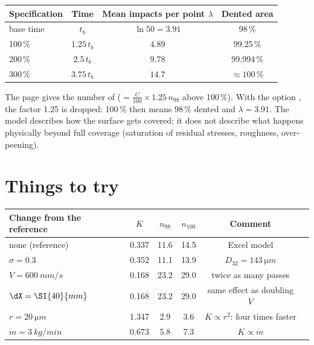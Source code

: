 \documentclass[11pt,a4paper]{article}
\begin{document}
\begin{center}
\begin{tabular}{@{}lccc@{}}
\toprule
Specification & Time & Mean impacts per point $\lambda$ & Dented area\\ \midrule
base time & $t_b$ & $\ln 50=3.91$ & 98\,\%\\
100\,\% & $1.25\,t_b$ & $4.89$ & 99.25\,\%\\
200\,\% & $2.5\,t_b$ & $9.78$ & 99.994\,\%\\
300\,\% & $3.75\,t_b$ & $14.7$ & $\approx100$\,\%\\ \bottomrule
\end{tabular}
\end{center}



\noindent The page gives the number of  ($=\frac{C}{100}\times1.25\,n_{98}$ above 100\,\%). With the option , the factor 1.25 is dropped: 100\,\% then means 98\,\% dented and $\lambda=3.91$. The model describes how the surface gets covered; it does not describe what happens physically beyond full coverage (saturation of residual stresses, roughness, over-peening).

\section{Things to try}

\begin{center}
\begin{tabular}{@{}lccccl@{}}
\toprule
Change from the reference & $K$ & $n_{98}$ & $n_{100}$ & Comment\\ \midrule
none (reference) & 0.337 & 11.6 & 14.5 & Excel model\\
$\sigma=0.3$ & 0.352 & 11.1 & 13.9 & $D_{32}=\SI{143}{\micro m}$\\
$V=\SI{600}{mm/s}$ & 0.168 & 23.2 & 29.0 & twice as many passes\\
$\dX=\SI{40}{mm}$ & 0.168 & 23.2 & 29.0 & same effect as doubling $V$\\
$r=\SI{20}{\micro m}$ & 1.347 & 2.9 & 3.6 & $K\propto r^2$: four times faster\\
$\dot m=\SI{3}{kg/min}$ & 0.673 & 5.8 & 7.3 & $K\propto\dot m$\\ \bottomrule
\end{tabular}
\end{center}
\end{document}
